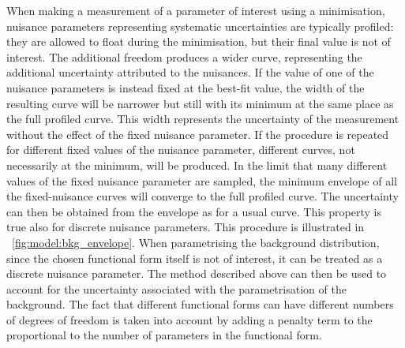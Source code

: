 When making a measurement of a parameter of interest using a \NLL minimisation, nuisance parameters representing systematic uncertainties are typically profiled: they are allowed to float during the minimisation, but their final value is not of interest. The additional freedom produces a wider \NLL curve, representing the additional uncertainty attributed to the nuisances. 
If the value of one of the nuisance parameters is instead fixed at the best-fit value, the width of the resulting \NLL curve will be narrower but still with its minimum at the same place as the full profiled \NLL curve. This width represents the uncertainty of the measurement without the effect of the fixed nuisance parameter. If the procedure is repeated for different fixed values of the nuisance parameter, different \NLL curves, not necessarily at the minimum, will be produced. In the limit that many different values of the fixed nuisance parameter are sampled, the minimum envelope of all the fixed-nuisance \NLL curves will converge to the full profiled \NLL curve. The uncertainty can then be obtained from the envelope as for a usual \NLL curve. This property is true also for discrete nuisance parameters. This procedure is illustrated in \Fig~\ref{fig:model:bkg_envelope}. When parametrising the background distribution, since the chosen functional form itself is not of interest, it can be treated as a discrete nuisance parameter. The method described above can then be used to account for the uncertainty associated with the parametrisation of the background. The fact that different functional forms can have different numbers of degrees of freedom is taken into account by adding a penalty term to the \NLL proportional to the number of parameters in the functional form. 

